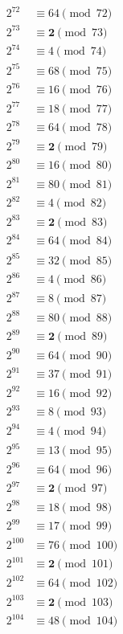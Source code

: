\documentclass[12pt]{handout}
\begin{document}
\begin{multicols}{3}
\begin{align*}
\end{align*}
\begin{align*}
2^{72} &\equiv 64 \pmod{72} \\
2^{73} &\equiv \mathbf{2} \pmod{73} \\
2^{74} &\equiv 4 \pmod{74} \\
2^{75} &\equiv 68 \pmod{75} \\
2^{76} &\equiv 16 \pmod{76} \\
2^{77} &\equiv 18 \pmod{77} \\
2^{78} &\equiv 64 \pmod{78} \\
2^{79} &\equiv \mathbf{2} \pmod{79} \\
2^{80} &\equiv 16 \pmod{80} \\
2^{81} &\equiv 80 \pmod{81} \\
2^{82} &\equiv 4 \pmod{82} \\
2^{83} &\equiv \mathbf{2} \pmod{83} \\
2^{84} &\equiv 64 \pmod{84} \\
2^{85} &\equiv 32 \pmod{85} \\
2^{86} &\equiv 4 \pmod{86} \\
2^{87} &\equiv 8 \pmod{87} \\
2^{88} &\equiv 80 \pmod{88} \\
2^{89} &\equiv \mathbf{2} \pmod{89} \\
2^{90} &\equiv 64 \pmod{90} \\
2^{91} &\equiv 37 \pmod{91} \\
2^{92} &\equiv 16 \pmod{92} \\
2^{93} &\equiv 8 \pmod{93} \\
2^{94} &\equiv 4 \pmod{94} \\
2^{95} &\equiv 13 \pmod{95} \\
2^{96} &\equiv 64 \pmod{96} \\
2^{97} &\equiv \mathbf{2} \pmod{97} \\
2^{98} &\equiv 18 \pmod{98} \\
2^{99} &\equiv 17 \pmod{99} \\
2^{100} &\equiv 76 \pmod{100} \\
2^{101} &\equiv \mathbf{2} \pmod{101} \\
2^{102} &\equiv 64 \pmod{102} \\
2^{103} &\equiv \mathbf{2} \pmod{103} \\
2^{104} &\equiv 48 \pmod{104} \\
\end{align*}
\end{multicols}
\end{document}
